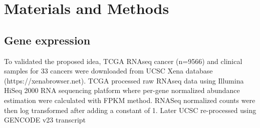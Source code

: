 \section{Materials and Methods}
\label{sec:methods}

\subsection{Gene expression}
To validated the proposed idea, TCGA RNAseq cancer (n=9566) and
clinical samples for 33 cancers were downloaded from UCSC Xena
database (https://xenabrowser.net). TCGA processed raw RNAseq data
using Illumina HiSeq 2000 RNA sequencing platform where per-gene
normalized abundance estimation were calculated with FPKM method.
RNASeq normalized counts were then log transformed after adding a
constant of 1. Later UCSC re-processed using GENCODE v23 transcript
